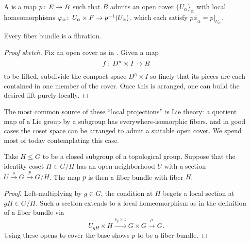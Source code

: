 \begin{definition}\label{FiberBundleDefn}%
A  is a map $p\colon\thinspace E \to B$ such that $B$ admits an open cover $\{U_\alpha\}_\alpha$ with local homeomorphisms $\varphi_\alpha\colon\thinspace U_\alpha \times F \to p^{-1}(U_\alpha)$, which each satisfy $p \phi_\alpha = p|_{U_\alpha}$.
\end{definition}

\begin{lemma}
Every fiber bundle is a fibration.
\end{lemma}
\begin{proof}[Proof sketch]
Fix an open cover as in .
Given a map \[f\colon\thinspace D^n \times I \to B\] to be lifted, subdivide the compact space $D^n \times I$ so finely that its pieces are each contained in one member of the cover.
Once this is arranged, one can build the desired lift purely locally.
\end{proof}

The most common source of these ``local projections'' is Lie theory: a quotient map of a Lie group by a subgroup has everywhere-isomorphic fibers, and in good cases the coset space can be arranged to admit a suitable open cover.
We spend most of today contemplating this case.

\begin{lemma}
Take $H \le G$ to be a closed subgroup of a topological group.
Suppose that the identity coset $H \in G/H$ has an open neighborhood $U$ with a section $U \xrightarrow s G \xrightarrow p G/H$.
The map $p$ is then a fiber bundle with fiber $H$.
\end{lemma}
\begin{proof}
Left-multiplying by $g \in G$, the condition at $H$ begets a local section at $gH \in G/H$.
Such a section extends to a local homeomorphism as in the definition of a fiber bundle via \[U_{gH} \times H \xrightarrow{s_g \times 1} G \times G \xrightarrow\mu G.\]
Using these opens to cover the base shows $p$ to be a fiber bundle.
\end{proof}

